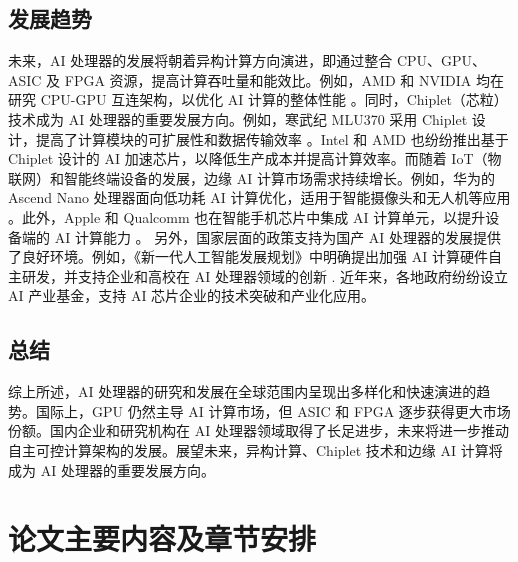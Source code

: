 \subsection{发展趋势}
未来，AI 处理器的发展将朝着异构计算方向演进，即通过整合 CPU、GPU、ASIC 及 FPGA 资源，提高计算吞吐量和能效比。例如，AMD 和 NVIDIA 均在研究 CPU-GPU 互连架构，以优化 AI 计算的整体性能 \cite{amd2022chiplet}。同时，Chiplet（芯粒）技术成为 AI 处理器的重要发展方向。例如，寒武纪 MLU370 采用 Chiplet 设计，提高了计算模块的可扩展性和数据传输效率 \cite{cambricon2022mlu}。Intel 和 AMD 也纷纷推出基于 Chiplet 设计的 AI 加速芯片，以降低生产成本并提高计算效率。而随着 IoT（物联网）和智能终端设备的发展，边缘 AI 计算市场需求持续增长。例如，华为的 Ascend Nano 处理器面向低功耗 AI 计算优化，适用于智能摄像头和无人机等应用 \cite{huawei2022ascendnano}。此外，Apple 和 Qualcomm 也在智能手机芯片中集成 AI 计算单元，以提升设备端的 AI 计算能力 \cite{qualcomm2023snapdragon}。
另外，国家层面的政策支持为国产 AI 处理器的发展提供了良好环境。例如，《新一代人工智能发展规划》中明确提出加强 AI 计算硬件自主研发，并支持企业和高校在 AI 处理器领域的创新 \cite{china2017ai}. 近年来，各地政府纷纷设立 AI 产业基金，支持 AI 芯片企业的技术突破和产业化应用。

\subsection{总结}

综上所述，AI 处理器的研究和发展在全球范围内呈现出多样化和快速演进的趋势。国际上，GPU 仍然主导 AI 计算市场，但 ASIC 和 FPGA 逐步获得更大市场份额。国内企业和研究机构在 AI 处理器领域取得了长足进步，未来将进一步推动自主可控计算架构的发展。展望未来，异构计算、Chiplet 技术和边缘 AI 计算将成为 AI 处理器的重要发展方向。



\section{论文主要内容及章节安排}


